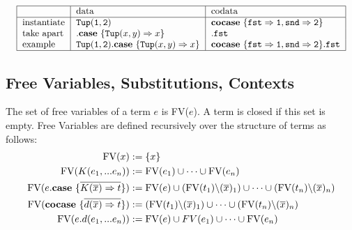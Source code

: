 \documentclass[twoside,12pt,a4paper]{article}
\begin{document}
\begin{example}
    \begin{align*}
        \resizebox{\columnwidth}{!}{ %
            \begin{tabular}{|l | l | l|}
                \hline
                & data & codata\\
                \hline
                instantiate & $\mathtt{Tup(1,2)}$&  $\excopatmatch{\mathtt{fst\Rightarrow 1, snd\Rightarrow 2}}$\\
                take apart & $.\expatmatch{\mathttbrackets{Tup}{x, y}\Rightarrow x}$ & $.\mathtt{fst}$\\
                example & $\mathtt{Tup(1,2)}.\expatmatch{\mathttbrackets{Tup}{x, y}\Rightarrow x}$&$\excopatmatch{\mathtt{fst\Rightarrow 1, snd\Rightarrow 2}}.\mathtt{fst}$\\
               \hline
           \end{tabular}
        }
    \end{align*}        
\end{example}

\subsection{Free Variables, Substitutions, Contexts}

\begin{definition}
    The set of free variables of a term $e$ is FV($e$). A term is closed if this set is empty.
    Free Variables are defined recursively over the structure of terms as follows:
    \begin{align*}
        \begin{split}
            \text{FV}(x) &:= \{x\}\\
            \text{FV}(K(e_1,...e_n)) &:= \text{FV}(e_1) \cup \dots\cup \text{FV}(e_n)\\
            \text{FV}(e.\textbf{case}\ \{\overline{K(\overline{x})\Rightarrow t}\}) &:= \text{FV}(e)\cup (\text{FV}(t_1)\backslash(\overline{x})_1)\cup \dots\cup (\text{FV}(t_n)\backslash(\overline{x})_n)\\
            \text{FV}(\textbf{cocase}\ \{\overline{d(\overline{x})\Rightarrow t}\}) &:= (\text{FV}(t_1)\backslash(\overline{x})_1)\cup \dots\cup (\text{FV}(t_n)\backslash(\overline{x})_n)\\
            \text{FV}(e.d(e_1,...e_n)) &:= \text{FV}(e)\cup FV(e_1) \cup \dots \cup \text{FV}(e_n)    
        \end{split}
    \end{align*}
\end{definition}
\end{document}
